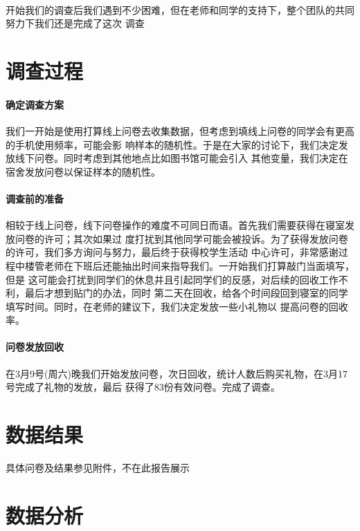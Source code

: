 \documentclass[UTF8]{ctexart}
\begin{document}
\paragraph{}
开始我们的调查后我们遇到不少困难，但在老师和同学的支持下，整个团队的共同努力下我们还是完成了这次
调查


\section{调查过程}
\paragraph*{确定调查方案}
我们一开始是使用打算线上问卷去收集数据，但考虑到填线上问卷的同学会有更高的手机使用频率，可能会影
响样本的随机性。于是在大家的讨论下，我们决定发放线下问卷。同时考虑到其他地点比如图书馆可能会引入
其他变量，我们决定在宿舍发放问卷以保证样本的随机性。
\paragraph*{调查前的准备}
相较于线上问卷，线下问卷操作的难度不可同日而语。首先我们需要获得在寝室发放问卷的许可；其次如果过
度打扰到其他同学可能会被投诉。为了获得发放问卷的许可，我们多方询问与努力，最后终于获得校学生活动
中心许可，非常感谢过程中楼管老师在下班后还能抽出时间来指导我们。一开始我们打算敲门当面填写，但是
这可能会打扰到同学们的休息并且引起同学们的反感，对后续的回收工作不利，最后才想到贴门的办法，同时
第二天在回收，给各个时间段回到寝室的同学填写时间。同时，在老师的建议下，我们决定发放一些小礼物以
提高问卷的回收率。
\paragraph*{问卷发放回收}
在3月9号(周六)晚我们开始发放问卷，次日回收，统计人数后购买礼物，在3月17号完成了礼物的发放，最后
获得了83份有效问卷。完成了调查。


\section{数据结果}
具体问卷及结果参见附件，不在此报告展示


\section{数据分析}
\end{document}
